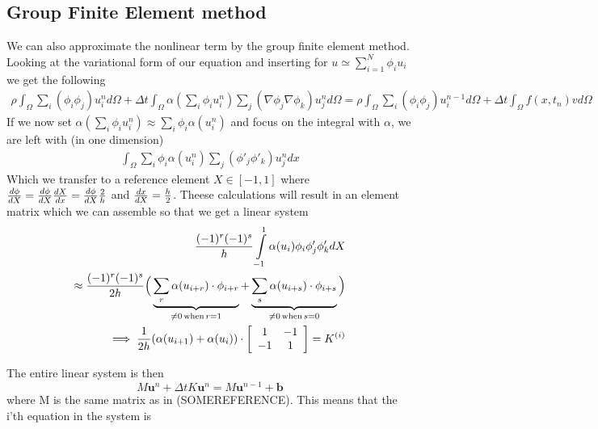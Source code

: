 \documentclass[a4paper,english, 10pt, twoside]{article}
\begin{document}
\subsection*{Group Finite Element method}
We can also approximate the nonlinear term by the group finite element method. Looking at the variational form of our equation and inserting 
for $u\simeq \sum\limits_{i=1}^N\phi_iu_i$ we get the following
\begin{align*}
\rho\int_\Omega \sum\limits_i(\phi_i\phi_j)u_i^nd\Omega+\Delta t\int_\Omega \alpha(\sum\limits_i\phi_iu_i^{n})\sum\limits_j(\nabla\phi_j\nabla 
\phi_k)u_j^nd\Omega = \rho\int_\Omega \sum\limits_i(\phi_i\phi_j)u_i^{n-1}d\Omega +\Delta t\int_\Omega f(x,t_n)vd\Omega
\end{align*}
If we now set $\alpha(\sum\limits_i\phi_iu_i^{n})\approx \sum\limits_i\phi_i\alpha(u_i^{n})$ and focus on the integral with $\alpha$, we are left with
(in one dimension)
\begin{align*}
 \int_\Omega \sum\limits_i\phi_i\alpha(u_i^{n})\sum\limits_j(\phi'_j\phi'_k)u_j^ndx
\end{align*}
Which we transfer to a reference element $X\in[-1,1]$ where ${d \phi \over d X} = {d\phi \over dX}{dX \over dx} = {d\phi \over dX}{2\over h}$ 
and ${dx\over dX}={h\over 2}$. Theese calculations will result in an element matrix which we can assemble so that we get a linear system
\begin{align*}
 {(-1)^r(-1)^s\over h}\int\limits_{-1}^1\alpha(u_i)\phi_i\phi'_j\phi'_kdX \\
 \approx{(-1)^r(-1)^s\over 2h}\Big(\underbrace{\sum\limits_r\alpha(u_{i+r})\cdot\phi_{i+r}}_{\neq0 \,\text{when}\, r=1} +
 \underbrace{\sum\limits_s\alpha(u_{i+s})\cdot\phi_{i+s}}_{\neq0 \,\text{when}\, s=0}\Big) \\
 \implies {1\over 2h}(\alpha(u_{i+1})+\alpha(u_i))\cdot\left[\begin{array}{c c}
                                                        1&-1\\
                                                        -1&1
                                                       \end{array}\right] =K^{(i)}
\end{align*}

The entire linear system is then
$$
M\mathbf{u}^n +\Delta tK\mathbf{u}^n = M\mathbf{u}^{n-1} +\mathbf{b}
$$
where M is the same matrix as in (SOMEREFERENCE). This means that the i'th equation in the system is
\end{document}
